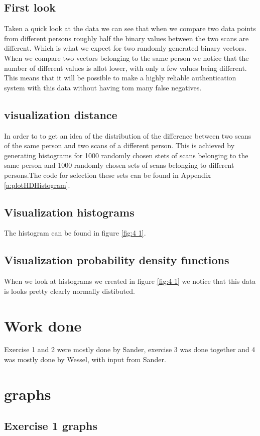 \documentclass[10pt,a4paper]{article}
\begin{document}
\subsection{First look}
Taken a quick look at the data we can see that when we compare two data points from different persons roughly half the binary values between the two scans are different. Which is what we expect for two randomly generated binary vectors. When we compare two vectors belonging to the same person we notice that the number of different values is allot lower, with only a few values being different. This means that it will be possible to make a highly reliable authentication system with this data without having tom many false negatives.

\subsection{visualization distance}
In order to to get an idea of the distribution of the difference between two scans of the same person and two scans of a different person. This is achieved by generating histograms for 1000 randomly chosen stets of scans belonging to the same person and 1000 randomly chosen sets of scans belonging to different persons.The code for selection these sets can be found in Appendix \ref{a:plotHDHistogram}. 

\subsection{Visualization histograms}
The histogram can be found in figure \ref{fig:4 1}.

\subsection{Visualization probability density functions}
When we look at histograms we created in figure \ref{fig:4 1} we notice that this data is looks pretty clearly normally distibuted. 
\section{Work done}
Exercise 1 and 2 were mostly done by Sander, exercise 3 was done together and 4 was mostly done by Wessel, with input from Sander.

\appendix
\section{graphs}
\subsection{Exercise 1 graphs}
\end{document}
